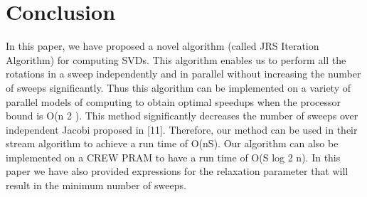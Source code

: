 \documentclass[10pt, conference, compsocconf]{IEEEtran}
\begin{document}
\section{Conclusion}

In this paper, we have proposed a novel algorithm (called
JRS Iteration Algorithm) for computing SVDs. This algorithm
enables us to perform all the rotations in a sweep independently
and in parallel without increasing the number of sweeps
significantly. Thus this algorithm can be implemented on a
variety of parallel models of computing to obtain optimal
speedups when the processor bound is O(n 2 ). This method
significantly decreases the number of sweeps over independent
Jacobi proposed in [11]. Therefore, our method can be used
in their stream algorithm to achieve a run time of O(nS). Our
algorithm can also be implemented on a CREW PRAM to have
a run time of O(S log 2 n). In this paper we have also provided
expressions for the relaxation parameter that will result in the
minimum number of sweeps.

%
%
%


\end{document}
